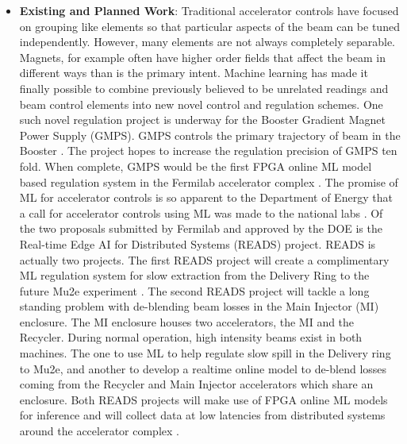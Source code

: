 \begin{itemize}
        \item \textbf{Existing and Planned Work}: 
            Traditional accelerator controls have focused on grouping like elements so that particular aspects of the beam can be tuned independently. However, many elements are not always completely separable. Magnets, for example often have higher order fields that affect the beam in different ways than is the primary intent. 
            Machine learning has made it finally possible to combine previously believed to be unrelated readings and beam control elements into new novel control and regulation schemes. One such novel regulation project is underway for the Booster Gradient Magnet Power Supply (GMPS). GMPS controls the primary trajectory of beam in the Booster \cite{operations_booster_rookie_book}. The project hopes to increase the regulation precision of GMPS ten fold. When complete, GMPS would be the first FPGA online ML model based regulation system in the Fermilab accelerator complex \cite{john2021realtime}. The promise of ML for accelerator controls is so apparent to the Department of Energy that a call for accelerator controls using ML was made to the national labs \cite{doe_foa_lab_20-2261}. Of the two proposals submitted by Fermilab and approved by the DOE is the Real-time Edge AI for Distributed Systems (READS) project. READS is actually two projects. The first READS project will create a complimentary ML regulation system for slow extraction from the Delivery Ring to the future Mu2e experiment \cite{bartoszek2015mu2e}. The second READS project will tackle a long standing problem with de-blending beam losses in the Main Injector (MI) enclosure. The MI enclosure houses two accelerators, the MI and the Recycler. During normal operation, high intensity beams exist in both machines. The one to use ML to help regulate slow spill in the Delivery ring to Mu2e, and another to develop a realtime online model to de-blend losses coming from the Recycler and Main Injector accelerators which share an enclosure. Both READS projects will make use of FPGA online ML models for inference and will collect data at low latencies from distributed systems around the accelerator complex \cite{seiya2021accelerator}.
    \end{itemize}
